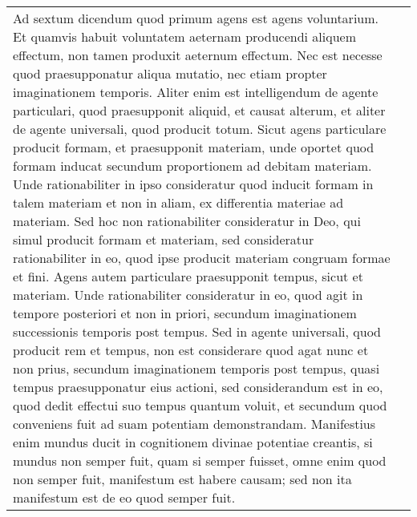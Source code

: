 \documentclass[10pt]{jsarticle} %
\begin{document}
\begin{longtable}{p{21em}p{21em}}
{\sc Ad sextum dicendum} quod primum agens est agens voluntarium. Et quamvis
 habuit voluntatem aeternam producendi aliquem effectum, non tamen
 produxit aeternum effectum. Nec est necesse quod praesupponatur aliqua
 mutatio, nec etiam propter imaginationem temporis. Aliter enim est
 intelligendum de agente particulari, quod praesupponit aliquid, et
 causat alterum, et aliter de agente universali, quod producit
 totum. Sicut agens particulare producit formam, et praesupponit
 materiam, unde oportet quod formam inducat secundum proportionem ad
 debitam materiam. Unde rationabiliter in ipso consideratur quod inducit
 formam in talem materiam et non in aliam, ex differentia materiae ad
 materiam. Sed hoc non rationabiliter consideratur in Deo, qui simul
 producit formam et materiam, sed consideratur rationabiliter in eo,
 quod ipse producit materiam congruam formae et fini. Agens autem
 particulare praesupponit tempus, sicut et materiam. Unde rationabiliter
 consideratur in eo, quod agit in tempore posteriori et non in priori,
 secundum imaginationem successionis temporis post tempus. Sed in agente
 universali, quod producit rem et tempus, non est considerare quod agat
 nunc et non prius, secundum imaginationem temporis post tempus, quasi
 tempus praesupponatur eius actioni, sed considerandum est in eo, quod
 dedit effectui suo tempus quantum voluit, et secundum quod conveniens
 fuit ad suam potentiam demonstrandam. Manifestius enim mundus ducit in
 cognitionem divinae potentiae creantis, si mundus non semper fuit, quam
 si semper fuisset, omne enim quod non semper fuit, manifestum est
 habere causam; sed non ita manifestum est de eo quod semper fuit.

&



\end{longtable}
\end{document}
